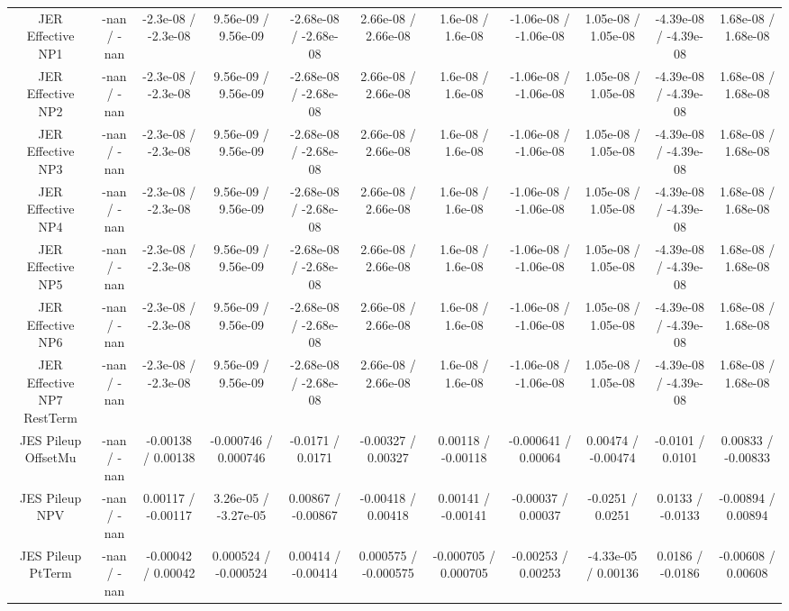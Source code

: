 \begin{table}[htbp]
\begin{center}
\begin{tabular}{|c|c|c|c|c|c|c|c|c|c|c|}
  JER Effective NP1 & -nan / -nan & -2.3e-08 / -2.3e-08 & 9.56e-09 / 9.56e-09 & -2.68e-08 / -2.68e-08 & 2.66e-08 / 2.66e-08 & 1.6e-08 / 1.6e-08 & -1.06e-08 / -1.06e-08 & 1.05e-08 / 1.05e-08 & -4.39e-08 / -4.39e-08 & 1.68e-08 / 1.68e-08 \\ 
  JER Effective NP2 & -nan / -nan & -2.3e-08 / -2.3e-08 & 9.56e-09 / 9.56e-09 & -2.68e-08 / -2.68e-08 & 2.66e-08 / 2.66e-08 & 1.6e-08 / 1.6e-08 & -1.06e-08 / -1.06e-08 & 1.05e-08 / 1.05e-08 & -4.39e-08 / -4.39e-08 & 1.68e-08 / 1.68e-08 \\ 
  JER Effective NP3 & -nan / -nan & -2.3e-08 / -2.3e-08 & 9.56e-09 / 9.56e-09 & -2.68e-08 / -2.68e-08 & 2.66e-08 / 2.66e-08 & 1.6e-08 / 1.6e-08 & -1.06e-08 / -1.06e-08 & 1.05e-08 / 1.05e-08 & -4.39e-08 / -4.39e-08 & 1.68e-08 / 1.68e-08 \\ 
  JER Effective NP4 & -nan / -nan & -2.3e-08 / -2.3e-08 & 9.56e-09 / 9.56e-09 & -2.68e-08 / -2.68e-08 & 2.66e-08 / 2.66e-08 & 1.6e-08 / 1.6e-08 & -1.06e-08 / -1.06e-08 & 1.05e-08 / 1.05e-08 & -4.39e-08 / -4.39e-08 & 1.68e-08 / 1.68e-08 \\ 
  JER Effective NP5 & -nan / -nan & -2.3e-08 / -2.3e-08 & 9.56e-09 / 9.56e-09 & -2.68e-08 / -2.68e-08 & 2.66e-08 / 2.66e-08 & 1.6e-08 / 1.6e-08 & -1.06e-08 / -1.06e-08 & 1.05e-08 / 1.05e-08 & -4.39e-08 / -4.39e-08 & 1.68e-08 / 1.68e-08 \\ 
  JER Effective NP6 & -nan / -nan & -2.3e-08 / -2.3e-08 & 9.56e-09 / 9.56e-09 & -2.68e-08 / -2.68e-08 & 2.66e-08 / 2.66e-08 & 1.6e-08 / 1.6e-08 & -1.06e-08 / -1.06e-08 & 1.05e-08 / 1.05e-08 & -4.39e-08 / -4.39e-08 & 1.68e-08 / 1.68e-08 \\ 
  JER Effective NP7 RestTerm & -nan / -nan & -2.3e-08 / -2.3e-08 & 9.56e-09 / 9.56e-09 & -2.68e-08 / -2.68e-08 & 2.66e-08 / 2.66e-08 & 1.6e-08 / 1.6e-08 & -1.06e-08 / -1.06e-08 & 1.05e-08 / 1.05e-08 & -4.39e-08 / -4.39e-08 & 1.68e-08 / 1.68e-08 \\ 
  JES Pileup OffsetMu & -nan / -nan & -0.00138 / 0.00138 & -0.000746 / 0.000746 & -0.0171 / 0.0171 & -0.00327 / 0.00327 & 0.00118 / -0.00118 & -0.000641 / 0.00064 & 0.00474 / -0.00474 & -0.0101 / 0.0101 & 0.00833 / -0.00833 \\ 
  JES Pileup NPV & -nan / -nan & 0.00117 / -0.00117 & 3.26e-05 / -3.27e-05 & 0.00867 / -0.00867 & -0.00418 / 0.00418 & 0.00141 / -0.00141 & -0.00037 / 0.00037 & -0.0251 / 0.0251 & 0.0133 / -0.0133 & -0.00894 / 0.00894 \\ 
  JES Pileup PtTerm & -nan / -nan & -0.00042 / 0.00042 & 0.000524 / -0.000524 & 0.00414 / -0.00414 & 0.000575 / -0.000575 & -0.000705 / 0.000705 & -0.00253 / 0.00253 & -4.33e-05 / 0.00136 & 0.0186 / -0.0186 & -0.00608 / 0.00608 \\ 

\end{tabular}
\end{center}
\end{table}
